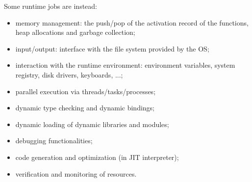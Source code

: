 Some runtime jobs are instead:
\begin{itemize}
    \item memory management: the push/pop of the activation record of the functions, heap allocations and garbage collection;
    \item input/output: interface with the file system provided by the OS;
    \item interaction with the runtime environment: environment variables, system registry, disk drivers, keyboards, ...;
    \item parallel execution via threads/tasks/processes;
    \item dynamic type checking and dynamic bindings;
    \item dynamic loading of dynamic libraries and modules;
    \item debugging functionalities;
    \item code generation and optimization (in JIT interpreter);
    \item verification and monitoring of resources.
\end{itemize}

